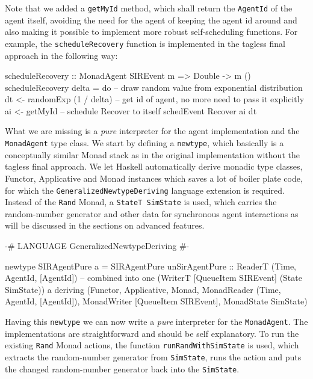 Note that we added a \texttt{getMyId} method, which shall return the \texttt{AgentId} of the agent itself, avoiding the need for the agent of keeping the agent id around and also making it possible to implement more robust self-scheduling functions. For example, the \texttt{scheduleRecovery} function is implemented in the tagless final approach in the following way:

\begin{HaskellCode}
scheduleRecovery :: MonadAgent SIREvent m => Double -> m ()
scheduleRecovery delta = do
  -- draw random value from exponential distribution
  dt <- randomExp (1 / delta)
  -- get id of agent, no more need to pass it explicitly
  ai <- getMyId
  -- schedule Recover to itself
  schedEvent Recover ai dt
\end{HaskellCode}

What we are missing is a \textit{pure} interpreter for the agent implementation and the \texttt{MonadAgent} type class. We start by defining a \texttt{newtype}, which basically is a conceptually similar Monad stack as in the original implementation without the tagless final approach. We let Haskell automatically derive monadic type classes, Functor, Applicative and Monad instances which saves a lot of boiler plate code, for which the \texttt{GeneralizedNewtypeDeriving} language extension is required. Instead of the \texttt{Rand} Monad, a \texttt{StateT SimState} is used, which carries the random-number generator and other data  for synchronous agent interactions as will be discussed in the sections on advanced features.

\begin{HaskellCode}
{-# LANGUAGE GeneralizedNewtypeDeriving #-}

newtype SIRAgentPure a = SIRAgentPure 
  { unSirAgentPure :: ReaderT (Time, AgentId, [AgentId]) -- combined into one
                        (WriterT [QueueItem SIREvent]
                          (State SimState)) a}
  deriving (Functor, Applicative, Monad, 
            MonadReader (Time, AgentId, [AgentId]),
            MonadWriter [QueueItem SIREvent],  
            MonadState SimState)
\end{HaskellCode}

Having this \texttt{newtype} we can now write a \textit{pure} interpreter for the \texttt{MonadAgent}. The implementations are straightforward and should be self explanatory. To run the existing \texttt{Rand} Monad actions, the function \texttt{runRandWithSimState} is used, which extracts the random-number generator from \texttt{SimState}, runs the action and puts the changed random-number generator back into the \texttt{SimState}.

